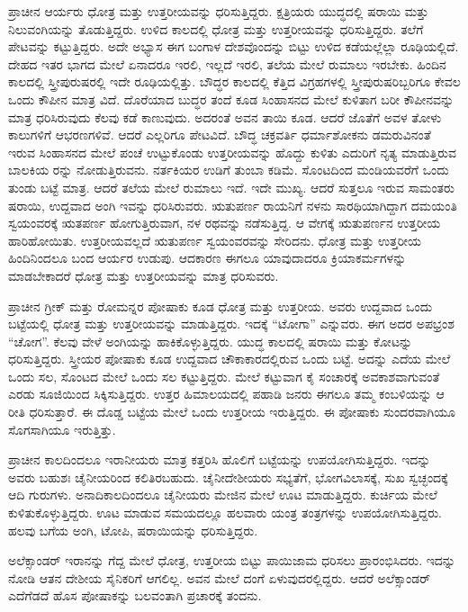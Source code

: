 ಪ್ರಾಚೀನ ಆರ್ಯರು ಧೋತ್ರ ಮತ್ತು ಉತ್ತರೀಯವನ್ನು ಧರಿಸುತ್ತಿದ್ದರು. ಕ್ಷತ್ರಿಯರು ಯುದ್ಧದಲ್ಲಿ ಷರಾಯಿ ಮತ್ತು ನಿಲುವಂಗಿಯನ್ನು ತೊಡುತ್ತಿದ್ದರು. ಉಳಿದ ಕಾಲದಲ್ಲಿ ಧೋತ್ರ ಮತ್ತು ಉತ್ತರೀಯವನ್ನು ಧರಿಸುತ್ತಿದ್ದರು. ತಲೆಗೆ ಪೇಟವನ್ನು ಕಟ್ಟುತ್ತಿದ್ದರು. ಅದೇ ಅಭ್ಯಾಸ ಈಗ ಬಂಗಾಳ ದೇಶವೊಂದನ್ನು ಬಿಟ್ಟು ಉಳಿದ ಕಡೆಯಲ್ಲೆಲ್ಲಾ ರೂಢಿಯಲ್ಲಿದೆ. ದೇಹದ ಇತರ ಭಾಗದ ಮೇಲೆ ಏನಾದರೂ ಇರಲಿ, ಇಲ್ಲದೆ ಇರಲಿ, ತಲೆಯ ಮೇಲೆ ರುಮಾಲು ಇರಬೇಕು. ಹಿಂದಿನ ಕಾಲದಲ್ಲಿ ಸ್ತ್ರೀಪುರುಷರಲ್ಲಿ ಇದೇ ರೂಢಿಯಲ್ಲಿತ್ತು. ಬೌದ್ಧರ ಕಾಲದಲ್ಲಿ ಕೆತ್ತಿದ ವಿಗ್ರಹಗಳಲ್ಲಿ ಸ್ತ್ರೀಪುರುಷರಿಬ್ಬರಿಗೂ ಕೇವಲ ಒಂದು ಕೌಪೀನ ಮಾತ್ರ ವಿದೆ. ದೊರೆಯಾದ ಬುದ್ಧರ ತಂದೆ ಕೂಡ ಸಿಂಹಾಸನದ ಮೇಲೆ ಕುಳಿತಾಗ ಬರೀ ಕೌಪೀನವನ್ನು ಮಾತ್ರ ಧರಿಸಿರುವುದು ಕೆಲವು ಕಡೆ ಕಾಣುವುದು. ಅದರಂತೆ ಅವನ ತಾಯಿ ಕೂಡ. ಆದರೆ ಜೊತೆಗೆ ಅವಳ ತೋಳು ಕಾಲುಗಳಿಗೆ ಆಭರಣಗಳಿವೆ. ಆದರೆ ಎಲ್ಲರಿಗೂ ಪೇಟವಿದೆ. ಬೌದ್ಧ ಚಕ್ರವರ್ತಿ ಧರ್ಮಾಶೋಕನು ಡಮರುವಿನಂತೆ ಇರುವ ಸಿಂಹಾಸನದ ಮೇಲೆ ಪಂಚೆ ಉಟ್ಟುಕೊಂಡು ಉತ್ತರೀಯವನ್ನು ಹೊದ್ದು ಕುಳಿತು ಎದುರಿಗೆ ನೃತ್ಯ ಮಾಡುತ್ತಿರುವ ಬಾಲಕಿಯ ರನ್ನು ನೋಡುತ್ತಿರುವನು. ನರ್ತಕಿಯರ ಉಡಿಗೆ ತುಂಬಾ ಕಡಿಮೆ. ಸೊಂಟದಿಂದ ಮಂಡಿಯವರೆಗೆ ಒಂದು ತುಂಡು ಬಟ್ಟೆ ಮಾತ್ರ. ಆದರೆ ತಲೆಯ ಮೇಲೆ ರುಮಾಲು ಇದೆ. ಇದೇ ಮುಖ್ಯ. ಆದರೆ ಸುತ್ತಲೂ ಇರುವ ಸಾಮಂತರು ಷರಾಯಿ, ಉದ್ದವಾದ ಅಂಗಿ ಇವನ್ನು ಧರಿಸಿರುವರು. ಋತುಪರ್ಣ ರಾಯನಿಗೆ ನಳನು ಸಾರಥಿಯಾಗಿದ್ದಾಗ ದಮಯಂತಿ ಸ್ವಯಂವರಕ್ಕೆ ಋತಪರ್ಣ ಹೋಗುತ್ತಿರುವಾಗ, ನಳ ರಥವನ್ನು ನಡೆಸುತ್ತಿದ್ದ. ಆ ವೇಗಕ್ಕೆ ಋತುಪರ್ಣನ ಉತ್ತರೀಯ ಹಾರಿಹೋಯಿತು. ಉತ್ತರೀಯವಲ್ಲದೆ ಋತುಪರ್ಣ ಸ್ವಯಂವರವನ್ನು ಸೇರಿದನು. ಧೋತ್ರ ಮತ್ತು ಉತ್ತರೀಯ ಹಿಂದಿನಿಂದಲೂ ಬಂದ ಆರ್ಯರ ಉಡುಪು. ಆದಕಾರಣ ಈಗಲೂ ಯಾವುದಾದರೂ ಕ್ರಿಯಾಕರ್ಮಗಳನ್ನು ಮಾಡಬೇಕಾದರೆ ಧೋತ್ರ ಮತ್ತು ಉತ್ತರೀಯವನ್ನು ಮಾತ್ರ ಧರಿಸುವರು.

ಪ್ರಾಚೀನ ಗ್ರೀಕ್​ ಮತ್ತು ರೋಮನ್ನರ ಪೋಷಾಕು ಕೂಡ ಧೋತ್ರ ಮತ್ತು ಉತ್ತರೀಯ. ಅವರು ಉದ್ದವಾದ ಒಂದು ಬಟ್ಟೆಯಲ್ಲಿ ಧೋತ್ರ ಮತ್ತು ಉತ್ತರೀಯವನ್ನು ಮಾಡುತ್ತಿದ್ದರು. ಇದಕ್ಕೆ “ಟೋಗಾ” ಎನ್ನುವರು. ಈಗ ಅದರ ಅಪಭ್ರಂಶ “ಚೋಗ”. ಕೆಲವು ವೇಳೆ ಅಂಗಿಯನ್ನು ಹಾಕಿಕೊಳ್ಳುತ್ತಿದ್ದರು. ಯುದ್ಧ ಕಾಲದಲ್ಲಿ ಷರಾಯಿ ಮತ್ತು ಕೋಟನ್ನು ಧರಿಸುತ್ತಿದ್ದರು. ಸ್ತ್ರೀಯರ ಪೋಷಾಕು ಕೂಡ ಉದ್ದವಾದ ಚೌಕಾಕಾರದಲ್ಲಿರುವ ಒಂದು ಬಟ್ಟೆ. ಅದನ್ನು ಎದೆಯ ಮೇಲೆ ಒಂದು ಸಲ, ಸೊಂಟದ ಮೇಲೆ ಒಂದು ಸಲ ಕಟ್ಟುತ್ತಿದ್ದರು. ಮೇಲೆ ಕಟ್ಟುವಾಗ ಕೈ ಸಂಚಾರಕ್ಕೆ ಅವಕಾಶವಾಗುವಂತೆ ಎರಡು ಸೂಜಿಯಿಂದ ಸಿಕ್ಕಿಸುತ್ತಿದ್ದರು. ಉತ್ತರ ಹಿಮಾಲಯದಲ್ಲಿ ಪಹಾಡಿ ಜನರು ಈಗಲೂ ತಮ್ಮ ಕಂಬಳಿಯನ್ನು ಆ ರೀತಿ ಧರಿಸುತ್ತಾರೆ. ಈ ದೊಡ್ಡ ಬಟ್ಟೆಯ ಮೇಲೆ ಒಂದು ಉತ್ತರೀಯ ಇರುತ್ತಿದ್ದರು. ಈ ಪೋಷಾಕು ಸುಂದರವಾಗಿಯೂ ಸೊಗಸಾಗಿಯೂ ಇರುತ್ತಿತ್ತು.

ಪ್ರಾಚೀನ ಕಾಲದಿಂದಲೂ ಇರಾನೀಯರು ಮಾತ್ರ ಕತ್ತರಿಸಿ ಹೊಲಿಗೆ ಬಟ್ಟೆಯನ್ನು ಉಪಯೋಗಿಸುತ್ತಿದ್ದರು. ಇದನ್ನು ಅವರು ಬಹುಶಃ ಚೈನೀಯರಿಂದ ಕಲಿತಿರಬಹುದು. ಚೈನೀದೇಶೀಯರು ಸಭ್ಯತೆಗೆ, ಭೋಗವಿಲಾಸಕ್ಕೆ, ಸುಖ ಸ್ವಚ್ಛಂದಕ್ಕೆ ಆದಿ ಗುರುಗಳು. ಅನಾದಿಕಾಲದಿಂದಲೂ ಚೈನೀಯರು ಮೇಜಿನ ಮೇಲೆ ಊಟ ಮಾಡುತ್ತಿದ್ದರು. ಕುರ್ಚಿಯ ಮೇಲೆ ಕುಳಿತುಕೊಳ್ಳುತ್ತಿದ್ದರು. ಊಟ ಮಾಡುವ ಸಮಯದಲ್ಲೂ ಹಲವಾರು ಯಂತ್ರ ತಂತ್ರಗಳನ್ನು ಉಪಯೋಗಿಸುತ್ತಿದ್ದರು. ಹಲವು ಬಗೆಯ ಅಂಗಿ, ಟೋಪಿ, ಷರಾಯಿಯನ್ನು ಧರಿಸುತ್ತಿದ್ದರು.

ಅಲೆಕ್ಸಾಂಡರ್​ ಇರಾನನ್ನು ಗೆದ್ದ ಮೇಲೆ ಧೋತ್ರ, ಉತ್ತರೀಯ ಬಿಟ್ಟು ಪಾಯಿಜಾಮ ಧರಿಸಲು ಪ್ರಾರಂಭಿಸಿದರು. ಇದನ್ನು ನೋಡಿ ಆತನ ದೇಶೀಯ ಸೈನಿಕರಿಗೆ ಆಗಲಿಲ್ಲ. ಅವನ ಮೇಲೆ ದಂಗೆ ಏಳುವುದರಲ್ಲಿದ್ದರು. ಆದರೆ ಅಲೆಕ್ಸಾಂಡರ್​ ಎದೆಗೆಡದೆ ಹೊಸ ಪೋಷಾಕನ್ನು ಬಲವಂತಾಗಿ ಪ್ರಚಾರಕ್ಕೆ ತಂದನು.


